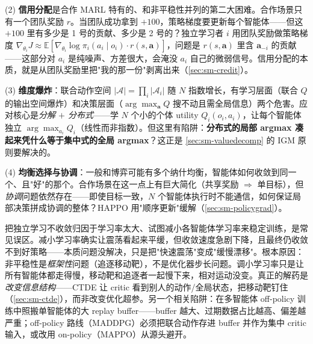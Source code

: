 (2) \textbf{信用分配}是合作 MARL 特有的、和非平稳性并列的第二大困难。合作场景只有一个团队奖励 $r$。当团队成功拿到 $+100$，策略梯度要更新每个智能体——但这 $+100$ 里有多少是 1 号的贡献、多少是 2 号的？独立学习者 $i$ 用团队奖励做策略梯度 $\nabla_{\theta_i}J\approx\mathbb{E}[\nabla_{\theta_i}\log\pi_i(a_i\mid o_i)\cdot r(s,\mathbf{a})]$，问题是 $r(s,\mathbf{a})$ 里含 $\mathbf{a}_{-i}$ 的贡献——这部分对 $a_i$ 是纯噪声、方差很大，会淹没 $a_i$ 自己的微弱信号。信用分配的本质，就是从团队奖励里把"我的那一份"剥离出来（\cref{sec:sm-credit}）。

(3) \textbf{维度爆炸}：联合动作空间 $|\boldsymbol{\mathcal{A}}|=\prod_i|\mathcal{A}_i|$ 随 $N$ 指数增长，有学习层面（联合 $Q$ 的输出空间爆炸）和决策层面（$\arg\max_{\mathbf{a}}Q$ 搜不动且需全局信息）两个危害。应对核心是\emph{分解 $+$ 分布式}——学 $N$ 个小的个体 utility $Q_i(o_i,a_i)$，让每个智能体独立 $\arg\max_{a_i}Q_i$（线性而非指数）。但这里有陷阱：\textbf{分布式的局部 argmax 凑起来凭什么等于集中式的全局 argmax}？这正是 \cref{sec:sm-valuedecomp} 的 IGM 原则要解决的。

(4) \textbf{均衡选择与协调}：一般和博弈可能有多个纳什均衡，智能体如何收敛到同一个、且"好"的那个。合作场景在这一点上有巨大简化（共享奖励 $\Rightarrow$ 单目标），但\emph{协调}问题依然存在——即使目标一致，$N$ 个智能体执行时不能通信，如何保证局部决策拼成协调的整体？HAPPO 用"顺序更新"缓解（\cref{sec:sm-policygrad}）。

\begin{pitfall}
把独立学习不收敛归因于学习率太大、试图减小各智能体学习率来稳定训练，是常见误区。减小学习率确实让震荡看起来平缓，但收敛速度急剧下降，且最终仍收敛不到好策略——本质问题没解决，只是把"快速震荡"变成"缓慢漂移"。根本原因：非平稳性是\emph{框架性}问题（追逐移动靶），不是优化器步长问题。调小学习率只是让所有智能体都走得慢，移动靶和追逐者一起慢下来，相对运动没变。真正的解药是\emph{改变信息结构}——CTDE 让 critic 看到别人的动作/全局状态，把移动靶钉住（\cref{sec:sm-ctde}），而非改变优化超参。另一个相关陷阱：在多智能体 off-policy 训练中照搬单智能体的大 replay buffer——buffer 越大、过期数据占比越高、偏差越严重；off-policy 路线（MADDPG）必须把联合动作存进 buffer 并作为集中 critic 输入，或改用 on-policy（MAPPO）从源头避开。
\end{pitfall}

